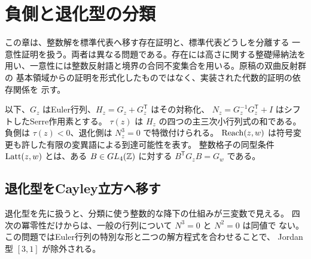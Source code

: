 \section{負側と退化型の分類}

この章は、整数解を標準代表へ移す存在証明と、標準代表どうしを分離する
一意性証明を扱う。両者は異なる問題である。存在には高さに関する整礎帰納法を
用い、一意性には整数反射語と境界の合同不変集合を用いる。原稿の双曲反射群の
基本領域からの証明を形式化したものではなく、実装された代数的証明の依存関係を
示す。

以下、\(G_z\) はEuler行列、\(H_z=G_z+G_z^{\mathsf T}\) はその対称化、
\(N_z=G_z^{-1}G_z^{\mathsf T}+I\) はシフトしたSerre作用素とする。
\(\tau(z)\) は \(H_z\) の四つの主三次小行列式の和である。
負側は \(\tau(z)<0\)、退化側は \(N_z^3=0\) で特徴付けられる。
\(\operatorname{Reach}(z,w)\) は符号変更も許した有限の変異語による到達可能性を表す。
整数格子の同型条件 \(\operatorname{Latt}(z,w)\) とは、ある \(B\in GL_4(\mathbb Z)\) に対する
\(B^{\mathsf T}G_zB=G_w\) である。

\subsection{退化型をCayley立方へ移す}

退化型を先に扱うと、分類に使う整数的な降下の仕組みが三変数で見える。
四次の冪零性だけからは、一般の行列について \(N^3=0\) と \(N^2=0\) は同値で
ない。この問題ではEuler行列の特別な形と二つの解方程式を合わせることで、
Jordan型 \([3,1]\) が除外される。

